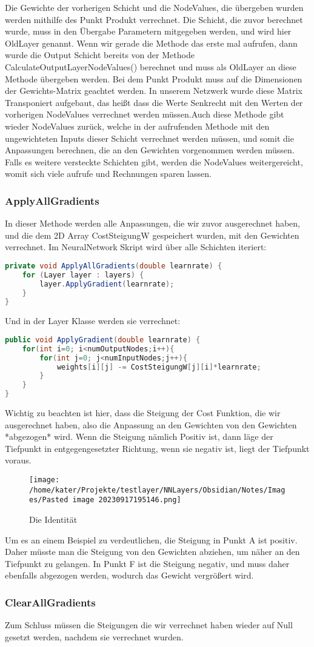 \documentclass[12pt]{article}
\begin{document}
Die Gewichte der vorherigen Schicht und die NodeValues, die übergeben wurden werden mithilfe des Punkt Produkt verrechnet. Die Schicht, die zuvor berechnet wurde, muss in den Übergabe Parametern mitgegeben werden, und wird hier OldLayer genannt. Wenn wir gerade die Methode das erste mal aufrufen, dann wurde die Output Schicht bereits von der Methode CalculateOutputLayerNodeValues() berechnet und muss als OldLayer an diese Methode übergeben werden.
Bei dem Punkt Produkt muss auf die Dimensionen der Gewichts-Matrix geachtet werden. In unserem Netzwerk wurde diese Matrix Transponiert aufgebaut, das heißt dass die Werte Senkrecht mit den Werten der vorherigen NodeValues verrechnet werden müssen.Auch diese Methode gibt wieder NodeValues zurück, welche in der aufrufenden Methode mit den ungewichteten Inputs dieser Schicht verrechnet werden müssen, und somit die Anpassungen berechnen, die an den Gewichten vorgenommen werden müssen. Falls es weitere versteckte Schichten gibt, werden die NodeValues weitergereicht, womit sich viele aufrufe und Rechnungen sparen lassen.\subsubsection{ ApplyAllGradients}In dieser Methode werden alle Anpassungen, die wir zuvor ausgerechnet haben, und die dem 2D Array CostSteigungW gespeichert wurden, mit den Gewichten verrechnet. Im NeuralNetwork Skript wird über alle Schichten iteriert:\begin{lstlisting}[language=Java]
private void ApplyAllGradients(double learnrate) {
    for (Layer layer : layers) {
        layer.ApplyGradient(learnrate);
    }
}
\end{lstlisting}Und in der Layer Klasse werden sie verrechnet:\begin{lstlisting}[language=Java]
public void ApplyGradient(double learnrate) {
    for(int i=0; i<numOutputNodes;i++){
        for(int j=0; j<numInputNodes;j++){
            weights[i][j] -= CostSteigungW[j][i]*learnrate;
        }
    }
}
\end{lstlisting}Wichtig zu beachten ist hier, dass die Steigung der Cost Funktion, die wir ausgerechnet haben, also die Anpassung an den Gewichten von den Gewichten *abgezogen* wird. Wenn die Steigung nämlich Positiv ist, dann läge der Tiefpunkt in entgegengesetzter Richtung, wenn sie negativ ist, liegt der Tiefpunkt voraus.\begin{figure}[H]
\centering
\texttt{[image: /home/kater/Projekte/testlayer/NNLayers/Obsidian/Notes/Images/Pasted image 20230917195146.png]}
\caption{Die Identität}
\label{Was kommt hier rein?}\end{figure}Um es an einem Beispiel zu verdeutlichen, die Steigung in Punkt A ist positiv. Daher müsste man die Steigung von den Gewichten abziehen, um näher an den Tiefpunkt zu gelangen. In Punkt F ist die Steigung negativ, und muss daher ebenfalls abgezogen werden, wodurch das Gewicht vergrößert wird.\subsubsection{ ClearAllGradients}Zum Schluss müssen die Steigungen die wir verrechnet haben wieder auf Null gesetzt werden, nachdem sie verrechnet wurden.
\end{document}
